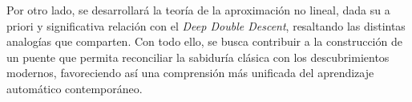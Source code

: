 Por otro lado, se desarrollará la teoría de la aproximación no lineal, dada su a priori y significativa relación con el \emph{Deep Double Descent}, resaltando las distintas analogías que comparten. Con todo ello, se busca contribuir a la construcción de un puente que permita reconciliar la sabiduría clásica con los descubrimientos modernos, favoreciendo así una comprensión más unificada del aprendizaje automático contemporáneo.\newline